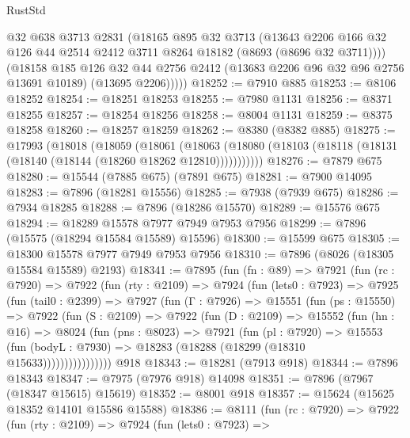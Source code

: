 \begin{lexlean}{RustStd}
\begin{coremodule}
          @32
          @638
          @3713
          @2831
          (@18165
            @895
            @32
            @3713
            (@13643
              @2206
              @166
              @32
              @126
              @44
              @2514
              @2412
              @3711
              @8264
              @18182
              (@8693 (@8696 @32 @3711))))
          (@18158
            @185
            @126
            @32
            @44
            @2756
            @2412
            (@13683 @2206 @96 @32 @96 @2756 @13691 @10189)
            (@13695 @2206)))))
@18252 := @7910 @885
@18253 := @8106 @18252
@18254 := @18251 @18253
@18255 := @7980 @1131
@18256 := @8371 @18255
@18257 := @18254 @18256
@18258 := @8004 @1131
@18259 := @8375 @18258
@18260 := @18257 @18259
@18262 := @8380 (@8382 @885)
@18275 := @17993
    (@18018
      (@18059
        (@18061
          (@18063 (@18080 (@18103 (@18118 (@18131 (@18140 (@18144 (@18260 @18262 @12810)))))))))))
@18276 := @7879 @675
@18280 := @15544 (@7885 @675) (@7891 @675)
@18281 := @7900 @14095
@18283 := @7896 (@18281 @15556)
@18285 := @7938 (@7939 @675)
@18286 := @7934 @18285
@18288 := @7896 (@18286 @15570)
@18289 := @15576 @675
@18294 := @18289 @15578 @7977 @7949 @7953 @7956
@18299 := @7896 (@15575 (@18294 @15584 @15589) @15596)
@18300 := @15599 @675
@18305 := @18300 @15578 @7977 @7949 @7953 @7956
@18310 := @7896 (@8026 (@18305 @15584 @15589) @2193)
@18341 := @7895
    (fun (fn : @89) =>
    @7921
      (fun (rc : @7920) =>
      @7922
        (fun (rty : @2109) =>
        @7924
          (fun (lets0 : @7923) =>
          @7925
            (fun (tail0 : @2399) =>
            @7927
              (fun (Γ : @7926) =>
              @15551
                (fun (ps : @15550) =>
                @7922
                  (fun (S : @2109) =>
                  @7922
                    (fun (D : @2109) =>
                    @15552
                      (fun (hn : @16) =>
                      @8024
                        (fun (pns : @8023) =>
                        @7921
                          (fun (pl : @7920) =>
                          @15553
                            (fun (bodyL : @7930) =>
                            @18283 (@18288 (@18299 (@18310 @15633))))))))))))))))
    @918
@18343 := @18281 (@7913 @918)
@18344 := @7896 @18343
@18347 := @7975 (@7976 @918) @14098
@18351 := @7896 (@7967 (@18347 @15615) @15619)
@18352 := @8001 @918
@18357 := @15624 (@15625 @18352 @14101 @15586 @15588)
@18386 := @8111
    (fun (rc : @7920) =>
    @7922
      (fun (rty : @2109) =>
      @7924
        (fun (lets0 : @7923) =>

\end{coremodule}
\end{lexlean}
